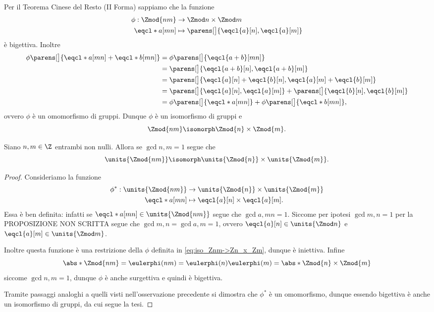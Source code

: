 \begin{remark}
    Per il Teorema Cinese del Resto (II Forma) sappiamo che la funzione 
    \begin{align} \label{eq:iso_Znm->Zn_x_Zm}
        \begin{split}
            \phi : \Zmod{nm} &\to \Zmod n \times \Zmod m\\
            \eqcl*{a}[mn] &\mapsto \parens[\big]{\eqcl{a}[n], \eqcl{a}[m]}
        \end{split}
    \end{align} è bigettiva. Inoltre \begin{align*}
        \phi\parens[\big]{\eqcl*{a}[mn] + \eqcl*{b}[mn]} &= \phi\parens[\big]{\eqcl{a+b}[mn]}\\
        &= \parens[\big]{\eqcl{a+b}[n], \eqcl{a+b}[m]}\\
        &= \parens[\big]{\eqcl{a}[n] + \eqcl{b}[n], \eqcl{a}[m] + \eqcl{b}[m]}\\
        &= \parens[\big]{\eqcl{a}[n], \eqcl{a}[m]} + \parens[\big]{\eqcl{b}[n], \eqcl{b}[m]}\\
        &= \phi\parens[\big]{\eqcl*{a}[mn]} + \phi\parens[\big]{\eqcl*{b}[mn]},
    \end{align*} ovvero $\phi$ è un omomorfismo di gruppi. Dunque $\phi$ è un isomorfismo di gruppi e \[
        \Zmod{nm} \isomorph \Zmod{n}\times \Zmod{m}.  
    \]
\end{remark}

\begin{corollary}
     Siano $n, m \in \Z$ entrambi non nulli. Allora se $\gcd{n, m} = 1$ segue che \begin{equation}
        \units{\Zmod{nm}} \isomorph \units{\Zmod{n}} \times \units{\Zmod{m}}.
    \end{equation}
\end{corollary}
\begin{proof}
    Consideriamo la funzione 
    \begin{align*}
        \phi^* : \units{\Zmod{nm}} &\to \units{\Zmod{n}} \times \units{\Zmod{m}}\\
        \eqcl*{a}[mn] &\mapsto \eqcl{a}[n] \times \eqcl{a}[m].
    \end{align*}
    Essa è ben definita: infatti se $\eqcl*{a}[mn] \in \units{\Zmod{nm}}$ segue che $\gcd{a, mn} = 1$. Siccome per ipotesi $\gcd{m, n} = 1$ per la PROPOSIZIONE NON SCRITTA segue che $\gcd{m, n} = \gcd{a, m} = 1$, ovvero $\eqcl{a}[n] \in \units{\Zmod n}$ e $\eqcl{a}[m] \in \units{\Zmod m}$.

    Inoltre questa funzione è una restrizione della $\phi$ definita in \eqref{eq:iso_Znm->Zn_x_Zm}, dunque è iniettiva. Infine \[
        \abs*{\Zmod{nm}} = \eulerphi(nm) = \eulerphi(n)\eulerphi(m) = \abs*{\Zmod{n} \times \Zmod{m}}    
    \] siccome $\gcd{n, m} = 1$, dunque $\phi$ è anche surgettiva e quindi è bigettiva.

    Tramite passaggi analoghi a quelli visti nell'osservazione precedente si dimostra che $\phi^*$ è un omomorfismo, dunque essendo bigettiva è anche un isomorfismo di gruppi, da cui segue la tesi.
\end{proof}

